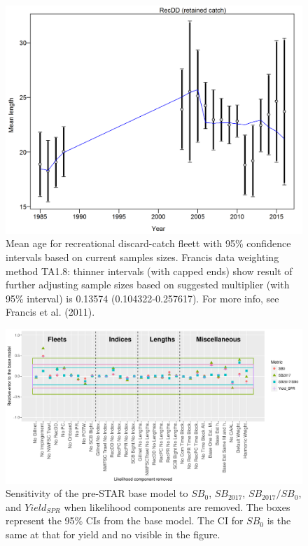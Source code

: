 \documentclass[12pt,]{article}
\begin{document}
\begin{figure}[htbp]
\centering
\includegraphics{r4ss/plots_mod1/comp_lenfit_data_weighting_TA1.8_RecDD.png}
\caption{Mean age for recreational discard-catch fleett with 95\%
confidence intervals based on current samples sizes. Francis data
weighting method TA1.8: thinner intervals (with capped ends) show result
of further adjusting sample sizes based on suggested multiplier (with
95\% interval) is 0.13574 (0.104322-0.257617). For more info, see
Francis et al. (2011).
\label{fig:comp_lenfit_data_weighting_TA1.8_RecDD}}
\end{figure}

\FloatBarrier

\begin{figure}[htbp]
\centering
\includegraphics{Figures/Sensitivity_all.pdf}
\caption{Sensitivity of the pre-STAR base model to \(SB_0\),
\(SB_{2017}\), \(SB_{2017}/SB_0\), and \(Yield_{SPR}\) when likelihood
components are removed. The boxes represent the 95\% CIs from the base
model. The CI for \(SB_0\) is the same at that for yield and no visible
in the figure. \label{fig:Sensitivity_all}}
\end{figure}
\end{document}
